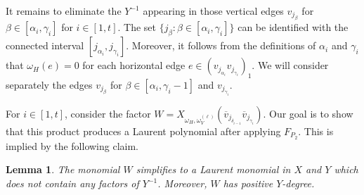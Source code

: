 \documentclass{amsart}
\newtheorem{lemma}[theorem]{Lemma}
\begin{document}
 It remains to eliminate the $Y^{-1}$ appearing in those vertical edges $v_{j_\beta}$ for $\beta\in[\alpha_i,\gamma_i]$ for $i\in[1,t]$. The set $\{j_\beta:\beta\in[\alpha_i,\gamma_i]\}$ can be identified with the connected interval $[j_{\alpha_i},j_{\gamma_i}]$.  Moreover, it follows from the definitions of $\alpha_i$ and $\gamma_i$ that $\omega_H(e)=0$ for each horizontal edge $e\in(v_{j_{\alpha_i}}v_{j_{\gamma_i}})_1$.  We will consider separately the edges $v_{j_\beta}$ for $\beta\in[\alpha_i,\gamma_i-1]$ and $v_{j_{\gamma_i}}$.  

 For $i\in[1,t]$, consider the factor $W=X_{\omega_H,\omega_V^{(\ell)}}(\overline{v}_{j_{\delta_{i-1}}}\overline{v}_{j_{\gamma_i}})$.  Our goal is to show that this product produces a Laurent polynomial after applying $F_{P_2}$.  This is implied by the following claim.
 \begin{lemma}
  The monomial $W$ simplifies to a Laurent monomial in $X$ and $Y$ which does not contain any factors of $Y^{-1}$.  Moreover, $W$ has positive $Y$-degree.
 \end{lemma}
\end{document}
